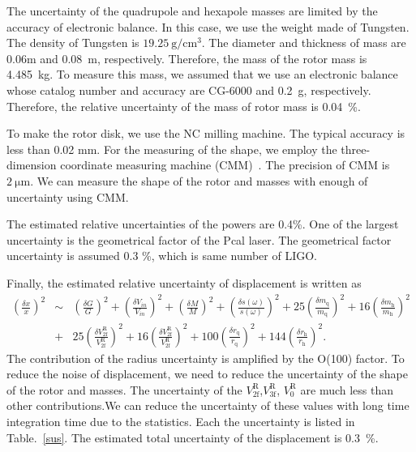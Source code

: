 \documentclass[A4]{spie}  %
\begin{document}
The uncertainty of the quadrupole and hexapole masses are limited by the accuracy of electronic balance. In this case, we use the weight made of Tungsten. The density of Tungsten is $19.25~\mathrm{g/cm^3}$. The diameter and thickness of mass are 0.06m and 0.08~m, respectively. Therefore, the mass of the rotor mass is 4.485~kg. To measure this mass, we assumed that we use an electronic balance whose catalog number and accuracy are CG-6000 and 0.2~g, respectively. Therefore, the relative uncertainty of the mass of rotor mass is 0.04~\%.

 To make the rotor disk, we use the NC milling machine. The typical accuracy is less than 0.02 mm. For the measuring of the shape, we employ the three-dimension coordinate measuring machine (CMM)~\cite{Inoue:2016kyq}. The precision of CMM is $2~\mathrm{\mu m}$. We can measure the shape of the rotor and masses with enough of uncertainty using CMM. 

The estimated relative uncertainties of the powers are 0.4\%. One of the largest uncertainty is the geometrical factor of the Pcal laser. The geometrical factor uncertainty is assumed 0.3 \%, which is same number of LIGO. 

 Finally, the estimated relative uncertainty of  displacement is written as
\begin{eqnarray}
\left( \frac{\delta x}{x} \right)^2 &\sim& \left( \frac{\delta G}{G} \right)^2 +\left( \frac{\delta V_{in}}{V_{in}} \right)^2+\left( \frac{\delta M}{M} \right)^2+\left( \frac{\delta s(\omega)}{s(\omega)} \right)^2+ 25\left( \frac{\delta m_{\mathrm{q}}}{m_{\mathrm{q}}} \right)^2 +16\left( \frac{\delta m_{\mathrm{h}}}{m_{\mathrm{h}}} \right)^2 \nonumber \\
&+&25\left( \frac{\delta V^{\mathrm{R}}_{{\mathrm{2f}}}}{V^{\mathrm{R}}_{{\mathrm{2f}}}} \right)^2+16\left( \frac{\delta V^{\mathrm{R}}_{{\mathrm{2f}}}}{V^{\mathrm{R}}_{{\mathrm{2f}}}} \right)^2+ 100\left( \frac{\delta r_{\mathrm{q}}}{r_{\mathrm{q}}} \right)^2 +144\left( \frac{\delta r_{\mathrm{h}}}{r_{\mathrm{h}}} \right)^2.
\end{eqnarray}
The contribution of the radius uncertainty is amplified by the O(100) factor. To reduce the noise of displacement, we need to reduce the uncertainty of the shape of the rotor and masses.
The uncertainty of the $V^{\mathrm{R}}_{\mathrm{2f}}$,$V^{\mathrm{R}}_{\mathrm{3f}}$, $V^{\mathrm{R}}_{0}$ are much less than other contributions.We can reduce the uncertainty of these values with long time integration time due to the statistics. Each the uncertainty is listed in Table.~\ref{sus}. The estimated  total uncertainty of the displacement is 0.3~\%.
\end{document}
